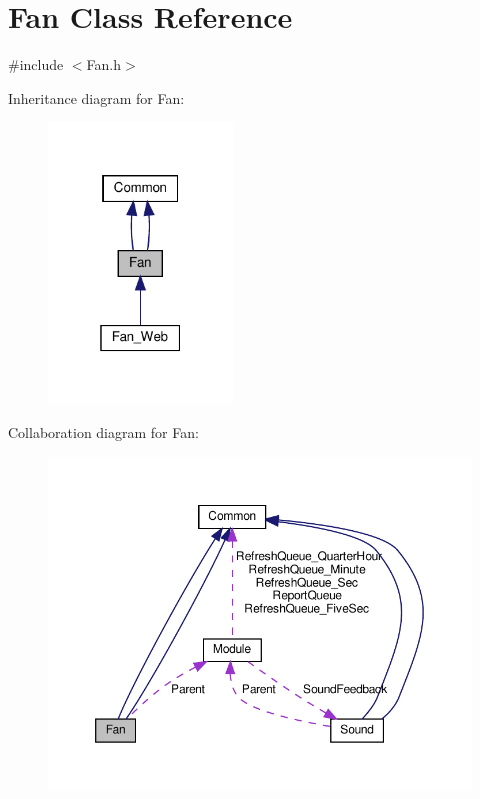 \hypertarget{class_fan}{}\section{Fan Class Reference}
\label{class_fan}


{\ttfamily \#include $<$Fan.\+h$>$}



Inheritance diagram for Fan\+:
\nopagebreak
\begin{figure}[H]
\begin{center}
\leavevmode
\includegraphics[width=139pt]{class_fan__inherit__graph}
\end{center}
\end{figure}


Collaboration diagram for Fan\+:
\nopagebreak
\begin{figure}[H]
\begin{center}
\leavevmode
\includegraphics[width=350pt]{class_fan__coll__graph}
\end{center}
\end{figure}
